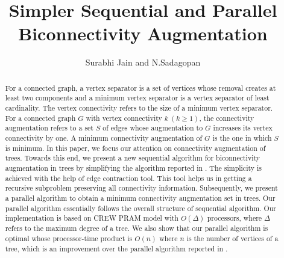 \documentclass[runningheads]{llncs}
\date{}
\title{Simpler Sequential and Parallel Biconnectivity Augmentation}
\author{Surabhi Jain and N.Sadagopan}
\institute{Department of Computer Science and Engineering,\\ Indian Institute of Information Technology, Design and Manufacturing, Kancheepuram, Chennai, India. \\
\email{\{surabhijain,sadagopan\}@iiitdm.ac.in}}
\begin{document}
\maketitle
\begin{abstract}
For a connected graph, a vertex separator is a set of vertices whose removal creates at least two components and a minimum vertex separator is a vertex separator of least cardinality.   The vertex connectivity refers to the size of a minimum vertex separator.  For a connected graph $G$ with vertex connectivity $k~ (k \geq 1)$, the connectivity augmentation refers to a set $S$ of edges whose augmentation to $G$ increases its vertex connectivity by one.  A minimum connectivity augmentation of $G$ is the one in which $S$ is minimum.  In this paper, we focus our attention on connectivity augmentation of trees. Towards this end, we present a new sequential algorithm for biconnectivity augmentation in trees by simplifying the algorithm reported in \cite{nsn}.  The simplicity is achieved with the help of edge contraction tool.  This tool helps us in getting a recursive subproblem preserving all connectivity information.  Subsequently, we present a parallel algorithm to obtain a minimum connectivity augmentation set in trees.  Our parallel algorithm essentially follows the overall structure of sequential algorithm.  Our implementation is based on CREW PRAM model with $O(\Delta)$ processors, where $\Delta$ refers to the maximum degree of a tree.  We also show that our parallel algorithm is optimal whose processor-time product is $O(n)$ where $n$ is the number of vertices of a tree, which is an improvement over the parallel algorithm reported in \cite{hsu}.  
\end{abstract}
\end{document}
